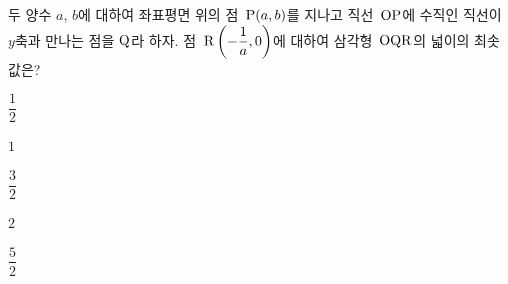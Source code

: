 두 양수 $a$, $b$에 대하여 좌표평면 위의 점~$\mathrm{P}(a{,}\mkern3mu\mathopen{}b)$를 지나고 직선~$\mathrm{OP}$에 수직인 직선이 $y$축과 만나는 점을 $\mathrm{Q}$라 하자. 점~$\mathrm{R}\left(-\dfrac{1}{a}{,}\mkern3mu\mathopen{}0\right)$에 대하여 삼각형~$\mathrm{OQR}$의 넓이의 최솟값은? 
\begin{choices32}{\rule[-3ex]{0pt}{8ex}$\dfrac{1}{2}$}{\rule[-3ex]{0pt}{8ex}$1$}{\rule[-3ex]{0pt}{8ex}$\dfrac{3}{2}$}{\rule[-3ex]{0pt}{8ex}$2$}{\rule[-3ex]{0pt}{8ex}$\dfrac{5}{2}$}\end{choices32}
